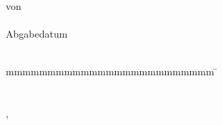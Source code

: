 \begin{titlepage}
\begin{center}
    \vspace{9mm}	von\\ \large{} %
    \vspace{1mm} 	{\large\textbf{\authorOne}}\\
    \vspace{6mm}	Abgabedatum\\
    \vspace{2mm}		\submissionDate\\
  \end{center}
  \vspace{10mm}
  \vspace{-4mm}
  \begin{tabbing}
    mmmmmmmmmmmmmmmmmmmmmmmmm   		\= \kill
    \textbf{\projectTimeframeText}  		\>  \projectTimeframe\\
    \textbf{\matriculationNumberText}  	\>  \matriculationNumber \\
    \textbf{\courseText}							\>	\course\\
    \textbf{\companyText}      	\>  \company, \companyLocation\\
    \textbf{\tutorText}              	\>  \tutor\\
    \textbf{\secondTutorText}              	\>  \secondTutor
  \end{tabbing}
\end{titlepage}

\restoregeometry
\fancyheadoffset{0pt}
